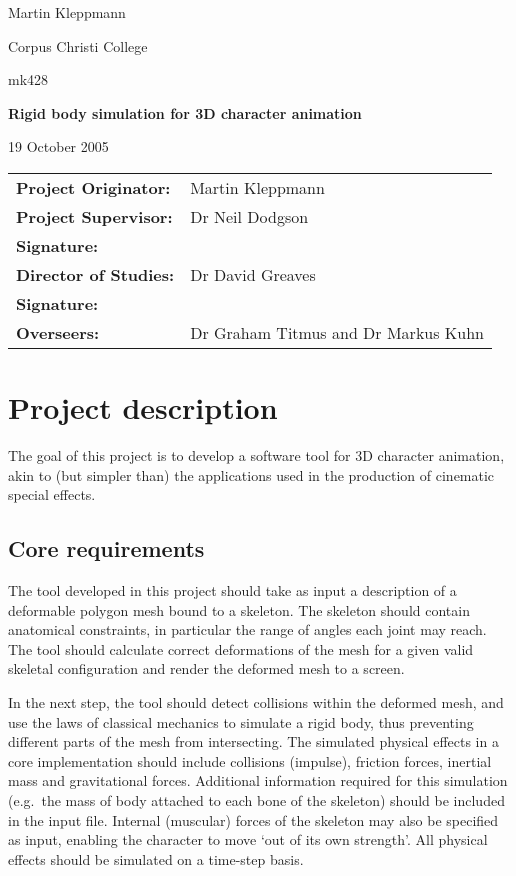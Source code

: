 %

{\hfill Martin Kleppmann}

{\hfill Corpus Christi College}

{\hfill mk428}

\vspace{3cm}
\centerline{\Large\bf Rigid body simulation for 3D character animation}
\vspace{1cm}
\centerline{19 October 2005}

\vspace{3cm}
\begin{tabular}{ll}
{\bf Project Originator:} & Martin Kleppmann \vspace{1.5cm}\\
{\bf Project Supervisor:} & Dr Neil Dodgson \vspace{0.5cm}\\
{\bf Signature:} & \vspace{1.5cm}\\
{\bf Director of Studies:} & Dr David Greaves \vspace{0.5cm}\\
{\bf Signature:} & \vspace{1.5cm}\\
{\bf Overseers:} & Dr Graham Titmus and Dr Markus Kuhn\\
\end{tabular}
\newpage

\section*{Project description}

The goal of this project is to develop a software tool for 3D character
animation, akin to (but simpler than) the applications used in the
production of cinematic special effects.

\subsection*{Core requirements}

The tool developed in this project should take as input a description
of a deformable polygon mesh bound to a skeleton. The skeleton should
contain anatomical constraints, in particular the range of angles each
joint may reach. The tool should calculate correct deformations of the
mesh for a given valid skeletal configuration and render the deformed
mesh to a screen.

In the next step, the tool should detect collisions within the
deformed mesh, and use the laws of classical mechanics to simulate a
rigid body, thus preventing different parts of the mesh from
intersecting. The simulated physical effects in a core implementation
should include collisions (impulse), friction forces, inertial mass
and gravitational forces. Additional information required for this
simulation (e.g.\ the mass of body attached to each bone of the
skeleton) should be included in the input file. Internal (muscular)
forces of the skeleton may also be specified as input, enabling the
character to move `out of its own strength'. All physical effects
should be simulated on a time-step basis.


